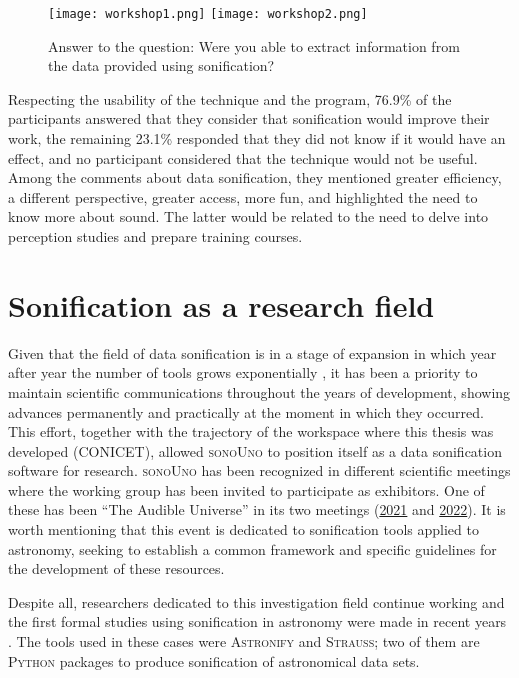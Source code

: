 \documentclass[baaa]{baaa}
\begin{document}
\begin{figure}[!t]
\centering
    \texttt{[image: workshop1.png]}
    \texttt{[image: workshop2.png]}
    \caption{Answer to the question: Were you able to extract information from the data provided using sonification?}
    \label{fig:workshop}
\end{figure}

Respecting the usability of the technique and the program, 76.9\% of the participants answered that they consider that sonification would improve their work, the remaining 23.1\% responded that they did not know if it would have an effect, and no participant considered that the technique would not be useful. Among the comments about data sonification, they mentioned greater efficiency, a different perspective, greater access, more fun, and highlighted the need to know more about sound. The latter would be related to the need to delve into perception studies and prepare training courses.

\section{Sonification as a research field}

Given that the field of data sonification is in a stage of expansion in which year after year the number of tools grows exponentially \citep{zanella2022}, it has been a priority to maintain scientific communications throughout the years of development, showing advances permanently and practically at the moment in which they occurred. This effort, together with the trajectory of the workspace where this thesis was developed (CONICET), allowed \textsc{sonoUno} to position itself as a data sonification software for research. \textsc{sonoUno} has been recognized in different scientific meetings where the working group has been invited to participate as exhibitors. One of these has been ``The Audible Universe'' in its two meetings (\href{https://www.lorentzcenter.nl/the-audible-universe.html}{2021} and \href{https://www.lorentzcenter.nl/the-audible-universe-2.html}{2022}). It is worth mentioning that this event is dedicated to sonification tools applied to astronomy, seeking to establish a common framework and specific guidelines for the development of these resources.

Despite all, researchers dedicated to this investigation field continue working and the first formal studies using sonification in astronomy were made in recent years \citep{MNRAStucker2022, trayford2023}. The tools used in these cases were \textsc{Astronify} and \textsc{Strauss}; two of them are \textsc{Python} packages to produce sonification of astronomical data sets.
\end{document}
